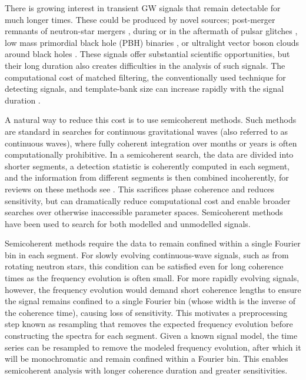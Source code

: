 \documentclass[aps,prd,amsmath,floats,floatfix, twocolumn,
superscriptaddress,nofootinbib,showpacs]{revtex4-2}
\begin{document}
There is growing interest in transient GW signals that remain detectable for much longer times. These could be produced by novel sources; post-merger remnants of neutron-star mergers \cite{LIGOScientific:2017fdd, Grace:2023kqq}, during or in the aftermath of pulsar glitches \cite{Keitel:2019zhb, Haskell:2023exob}, low mass primordial black hole (PBH) binaries \cite{Miller:2024rca, Andres-Carcasona:2024jvz, Rodriguez:2026oyia}, or ultralight vector boson clouds around black holes \cite{Siemonsen:2019ebd, Jones:2023fzz, LIGOScientific:2025csr}. These signals offer substantial scientific opportunities, but their long duration also creates difficulties in the analysis of such signals. The computational cost of matched filtering, the conventionally used technique for detecting signals, and template-bank size can increase rapidly with the signal duration \cite{Owen:1998dk}.

A natural way to reduce this cost is to use semicoherent methods. Such methods are standard in searches for continuous gravitational waves (also referred to as continuous waves), where fully coherent integration over months or years is often computationally prohibitive. In a semicoherent search, the data are divided into shorter segments, a detection statistic is coherently computed in each segment, and the information from different segments is then combined incoherently, for reviews on these methods see \cite{Wette:2023dom, Tenorio:2021wmz}. This sacrifices phase coherence and reduces sensitivity, but can dramatically reduce computational cost and enable broader searches over otherwise inaccessible parameter spaces. Semicoherent methods have been used to search for both modelled \cite{Piccinni:2018akm, Prix:2011qv} and unmodelled \cite{Suvorova:2016rdc, Sun:2017zge, Macquet:2021ttqa} signals. 

Semicoherent methods require the data to remain confined within a single Fourier bin in each segment. For slowly evolving continuous-wave signals, such as from rotating neutron stars, this condition can be satisfied even for long coherence times as the frequency evolution is often small. For more rapidly evolving signals, however, the frequency evolution would demand short coherence lengths to ensure the signal remains confined to a single Fourier bin (whose width is the inverse of the coherence time), causing loss of sensitivity. This motivates a preprocessing step known as resampling that removes the expected frequency evolution before constructing the spectra for each segment. Given a known signal model, the time series can be resampled to remove the modeled frequency evolution, after which it will be monochromatic and remain confined within a Fourier bin. This enables semicoherent analysis with longer coherence duration and greater sensitivities. 
\end{document}
